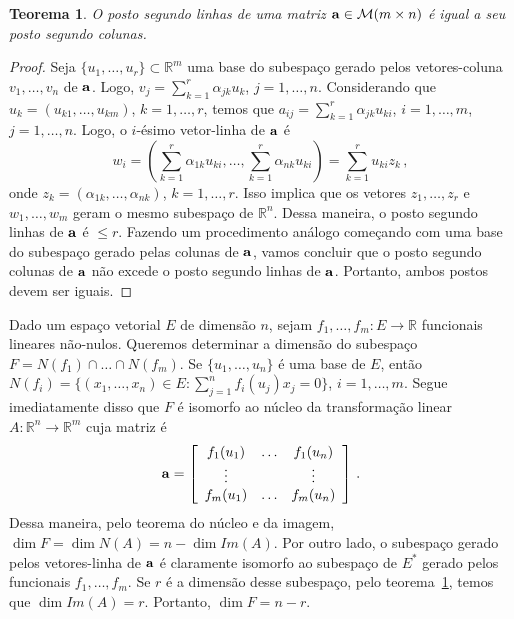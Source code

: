 \documentclass[12pt,a4paper]{article}
\newcommand{\dpar}[1]{\left(#1\right)}
\newcommand{\dsqr}[1]{\left[#1\right]}
\newcommand{\R}{\mathbb{R}}
\newtheorem{thm}{Teorema}[section]
\theoremstyle{definition}
\begin{document}
\begin{thm}
  \label{thm:14}
  O posto segundo linhas de uma matriz ${\bf a}\in{\cal M}(m\times n)$
  é igual a seu posto segundo colunas.
\end{thm}
\begin{proof}
  Seja $\{u_1,\ldots,u_r\}\subset \R^m$ uma base do subespaço gerado
  pelos ve\-to\-res-coluna $v_1,\ldots,v_n$ de ${\bf a}$. Logo,
  $v_j=\sum_{k=1}^r\alpha_{jk}u_k$, $j=1,\ldots,n$. Considerando que
  $u_k=(u_{k1},\ldots,u_{km})$, $k=1,\ldots,r$, temos que
  $a_{ij}=\sum_{k=1}^r\alpha_{jk}u_{ki}$, $i=1,\ldots,m$,
  $j=1,\ldots,n$. Logo, o $i$-ésimo vetor-linha de ${\bf a}$ é
  $$w_i=\dpar{\sum_{k=1}^r\alpha_{1k}u_{ki},\ldots,\sum_{k=1}^r\alpha_{nk}u_{ki}}=\sum_{k=1}^ru_{ki}z_k\,,$$
  onde $z_k=(\alpha_{1k},\ldots,\alpha_{nk})$, $k=1,\ldots,r$. Isso
  implica que os vetores $z_1,\ldots,z_r$ e $w_1,\ldots,w_m$ geram o
  mesmo subespaço de $\R^n$. Dessa maneira, o posto segundo linhas de
  ${\bf a}$ é $\le r$. Fazendo um procedimento análogo começando com
  uma base do subespaço gerado pelas colunas de ${\bf a}$, vamos
  concluir que o posto segundo colunas de ${\bf a}$ não excede o posto
  segundo linhas de ${\bf a}$. Portanto, ambos postos devem ser
  iguais.
\end{proof}

Dado um espaço vetorial $E$ de dimensão $n$, sejam
$f_1,\ldots,f_m:E\to\R$ funcionais lineares não-nulos. Queremos
determinar a dimensão do subespaço $F=N(f_1)\cap\ldots\cap N(f_m)$. Se
$\{u_1,\ldots,u_n\}$ é uma base de $E$, então
$N(f_i)=\{(x_1,\ldots,x_n)\in E:\sum_{j=1}^nf_i(u_j)x_j=0\}$,
$i=1,\ldots,m$. Segue imediatamente disso que $F$ é isomorfo ao núcleo
da transformação linear $A:\R^n\to\R^m$ cuja matriz é
$${\bf a}=\dsqr{
  \begin{array}{ccc}
    f_1(u_1)&\ldots&f_1(u_n)\\
    \vdots&&\vdots\\
    f_m(u_1)&\ldots&f_m(u_n)
  \end{array}
}\,.$$ Dessa maneira, pelo teorema do núcleo e da imagem,
$\dim F=\dim N(A)=n-\dim Im(A)$. Por outro lado, o subespaço gerado
pelos vetores-linha de ${\bf a}$ é claramente isomorfo ao subespaço de
$E^*$ gerado pelos funcionais $f_1,\ldots,f_m$. Se $r$ é a dimensão
desse subespaço, pelo teorema~\ref{thm:14}, temos que $\dim
Im(A)=r$. Portanto, $\dim F=n-r$.
\end{document}
